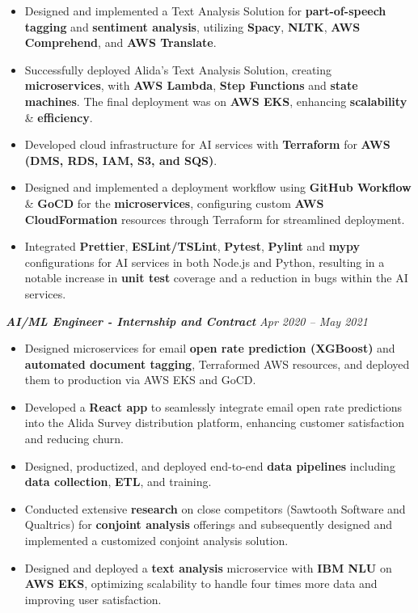 \documentclass[10pt,a4paper]{article}
\begin{document}
\begin{itemize}[leftmargin=1.2em, label=\textopenbullet]
  \item Designed and implemented a Text Analysis Solution for \textbf{part-of-speech tagging} and \textbf{sentiment analysis}, utilizing \textbf{Spacy}, \textbf{NLTK}, \textbf{AWS Comprehend}, and \textbf{AWS Translate}.
  \item Successfully deployed Alida's Text Analysis Solution, creating \textbf{microservices}, with \textbf{AWS Lambda}, \textbf{Step Functions} and \textbf{state machines}. The final deployment was on \textbf{AWS EKS}, enhancing \textbf{scalability} \& \textbf{efficiency}.
  \item Developed cloud infrastructure for AI services with \textbf{Terraform} for \textbf{AWS (DMS, RDS, IAM, S3, and SQS)}.
  \item Designed and implemented a deployment workflow using \textbf{GitHub Workflow} \& \textbf{GoCD} for the \textbf{microservices}, configuring custom \textbf{AWS CloudFormation} resources through Terraform for streamlined deployment.
  \item Integrated \textbf{Prettier}, \textbf{ESLint/TSLint}, \textbf{Pytest}, \textbf{Pylint} and \textbf{mypy} configurations for AI services in both Node.js and Python, resulting in a notable increase in \textbf{unit test} coverage and a reduction in bugs within the AI services.
\end{itemize}

\vspace{2pt}
\noindent\textit{\textbf{AI/ML Engineer - Internship and Contract}} \hfill \textit{Apr 2020 -- May 2021}

\begin{itemize}[leftmargin=1.2em, label=\textopenbullet]
  \item Designed microservices for email \textbf{open rate prediction (XGBoost)} and \textbf{automated document tagging}, Terraformed AWS resources, and deployed them to production via AWS EKS and GoCD.
  \item Developed a \textbf{React app} to seamlessly integrate email open rate predictions into the Alida Survey distribution platform, enhancing customer satisfaction and reducing churn.
  \item Designed, productized, and deployed end-to-end \textbf{data pipelines} including \textbf{data collection}, \textbf{ETL}, and training.
  \item Conducted extensive \textbf{research} on close competitors (Sawtooth Software and Qualtrics) for \textbf{conjoint analysis} offerings and subsequently designed and implemented a customized conjoint analysis solution.
  \item Designed and deployed a \textbf{text analysis} microservice with \textbf{IBM NLU} on \textbf{AWS EKS}, optimizing scalability to handle four times more data and improving user satisfaction.
\end{itemize}
\end{document}
